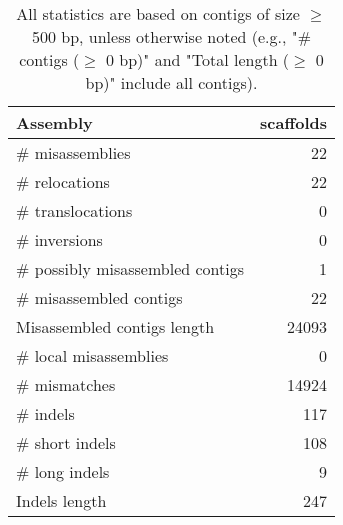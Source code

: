 \documentclass[12pt,a4paper]{article}
\begin{document}
\begin{table}[ht]
\begin{center}
\caption{All statistics are based on contigs of size $\geq$ 500 bp, unless otherwise noted (e.g., "\# contigs ($\geq$ 0 bp)" and "Total length ($\geq$ 0 bp)" include all contigs).}
\begin{tabular}{|l*{1}{|r}|}
\hline
Assembly & scaffolds \\ \hline
\# misassemblies & 22 \\ \hline
\hspace{5mm}\# relocations & 22 \\ \hline
\hspace{5mm}\# translocations & 0 \\ \hline
\hspace{5mm}\# inversions & 0 \\ \hline
\# possibly misassembled contigs & 1 \\ \hline
\# misassembled contigs & 22 \\ \hline
Misassembled contigs length & 24093 \\ \hline
\# local misassemblies & 0 \\ \hline
\# mismatches & 14924 \\ \hline
\# indels & 117 \\ \hline
\hspace{5mm}\# short indels & 108 \\ \hline
\hspace{5mm}\# long indels & 9 \\ \hline
Indels length & 247 \\ \hline
\end{tabular}
\end{center}
\end{table}
\end{document}
